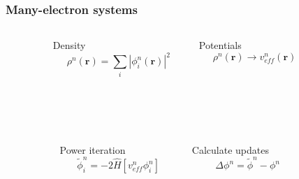 \begin{frame}
    \frametitle{Many-electron systems}
    \begin{columns}
    \begin{column}[b]{0.1\textwidth}
    \ \\
    \end{column}
    \begin{column}[b]{0.4\textwidth}
    \centering
    Density
    \begin{equation}
	\nonumber
	\rho^n(\boldsymbol{r}) = \sum_i |\phi_i^n(\boldsymbol{r})|^2
    \end{equation}
    \end{column}
    \begin{column}[b]{0.4\textwidth}
    \centering
    Potentials
    \begin{equation}   
	\nonumber
	\rho^n(\boldsymbol{r}) \rightarrow v_{eff}^n(\boldsymbol{r})
    \end{equation}
    \end{column}
    \begin{column}[b]{0.1\textwidth}
    \ \\
    \end{column}
    \end{columns}
    \ \\
    \ \\
    \begin{columns}
    \begin{column}[b]{0.1\textwidth}
    \ \\
    \end{column}
    \begin{column}[b]{0.4\textwidth}
    \centering
    Power iteration
    \begin{equation}
	\nonumber
	\tilde{\phi}_i^n = -2\hat{H}\left[v_{eff}^n\phi_i^n\right]
    \end{equation}
    \end{column}
    \begin{column}[b]{0.4\textwidth}
    \centering
    Calculate updates
    \begin{equation}
	\nonumber
	\Delta\phi^n = \tilde{\phi}^n - \phi^n
    \end{equation}
    \end{column}
    \begin{column}[b]{0.1\textwidth}
    \ \\
    \end{column}
    \end{columns}
    \ \\

\end{frame}
